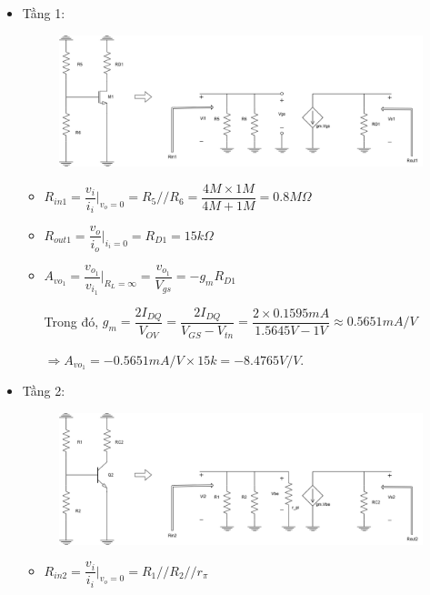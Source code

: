 \begin{itemize}[label=-]
	\item Tầng 1:
	
	\begin{figure}[H]
		\centering
		\includegraphics[width=.7\linewidth]{./my-chapters/my-diagrams/Question6/caub_stage1.png}
	\end{figure}
	
	\begin{itemize}[label = +]
		\item $R_{in1} = \dfrac{v_{i}}{i_{i}}|_{v_{o}=0} = R_{5} // R_{6} = \dfrac{4M \times 1M}{4M + 1M} = 0.8M \Omega$
		\item $R_{out1} = \dfrac{v_{o}}{i_{o}}|_{i_{i} = 0} = R_{D1} = 15k \Omega$
		\item $A_{vo_{1}} = \dfrac{v_{o_{1}}}{v_{i_{1}}}|_{R_{L} = \infty} = \dfrac{v_{o_{1}}}{V_{gs}} = -g_{m} R_{D1}$
		
		Trong đó, $g_{m} = \dfrac{2I_{DQ}}{V_{OV}} = \dfrac{2I_{DQ}}{V_{GS} - V_{tn}} = \dfrac{2\times 0.1595mA}{1.5645V - 1V} \approx 0.5651 mA/V$
		
		$\Rightarrow A_{vo_{1}} = -0.5651 mA/V \times 15k = -8.4765 V/V $.
	\end{itemize}
	
	\item Tầng 2:
	
	\begin{figure}[H]
		\centering
		\includegraphics[width=.7\linewidth]{./my-chapters/my-diagrams/Question6/caub_stage2.png}
	\end{figure}
	
	\begin{itemize}[label = +]
		\item $R_{in2} = \dfrac{v_{i}}{i_{i}}|_{v_{o}=0} = R_{1} // R_{2} // r_{\pi}$
		

\end{itemize}
\end{itemize}
